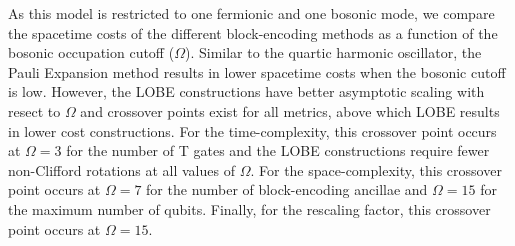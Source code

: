 As this model is restricted to one fermionic and one bosonic mode, we compare the spacetime costs of the different block-encoding methods as a function of the bosonic occupation cutoff ($\Omega$).
Similar to the quartic harmonic oscillator, the Pauli Expansion method results in lower spacetime costs when the bosonic cutoff is low.
However, the LOBE constructions have better asymptotic scaling with resect to $\Omega$ and crossover points exist for all metrics, above which LOBE results in lower cost constructions.
For the time-complexity, this crossover point occurs at $\Omega = 3$ for the number of T gates and the LOBE constructions require fewer non-Clifford rotations at all values of $\Omega$.
For the space-complexity, this crossover point occurs at $\Omega = 7$ for the number of block-encoding ancillae and $\Omega = 15$ for the maximum number of qubits.
Finally, for the rescaling factor, this crossover point occurs at $\Omega = 15$.